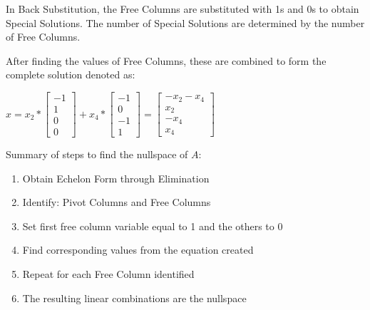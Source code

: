 \documentclass[10pt,a4paper]{article}
\begin{document}
In Back Substitution, the Free Columns are substituted with 1s and 0s to obtain Special Solutions.
The number of Special Solutions are determined by the number of Free Columns. \par 
After finding the values of Free Columns, these are combined to form the complete solution denoted as:
\begin{center}
	$x=x_2*\begin{bmatrix}
		-1 \\ 
		1 \\
		0 \\
		0
	\end{bmatrix} + x_4*\begin{bmatrix}
		-1 \\ 
		0 \\
		-1 \\
		1
	\end{bmatrix} = \begin{bmatrix}
		-x_2 - x_4 \\ 
		x_2 \\
		-x_4 \\
		x_4
	\end{bmatrix} $
\end{center}
\begin{tcolorbox}[breakable,colback=white,colframe=black,width=\dimexpr\textwidth+12mm\relax,enlarge left by=-6mm]
Summary of steps to find the nullspace of $A$:
\begin{enumerate}
	\item Obtain Echelon Form through Elimination
	\item Identify: Pivot Columns and Free Columns
	\item Set first free column variable equal to 1 and the others to 0
	\item Find corresponding values from the equation created
	\item Repeat for each Free Column identified
	\item The resulting linear combinations are the nullspace
\end{enumerate}
\end{tcolorbox}
\end{document}
